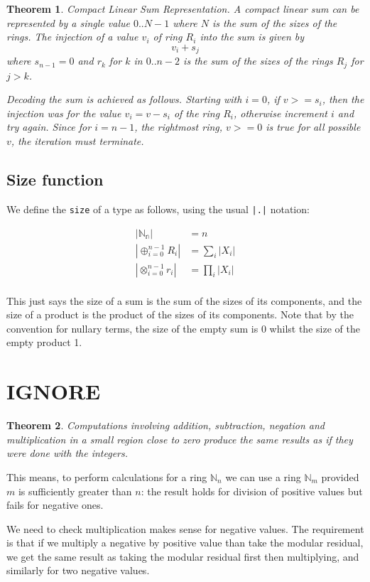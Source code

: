\documentclass{article}
\newtheorem{theorem}{Theorem}
\begin{document}
\begin{theorem} {\em Compact Linear Sum Representation}.
A compact linear sum can be represented by a single value
$0..{N-1}$ where $N$ is the sum of the sizes of the rings.
The injection of a value $v_i$ of ring $R_i$ into the sum is given by
$$v_i + s_j$$
where $s_{n-1}=0$ and $r_k$ for $k$ in $0..n-2$ is the sum of the sizes of the rings
$R_j$ for $j>k$.

Decoding the sum is achieved as follows. Starting with $i=0$, if $v >= s_i$,
then the injection was for the value $v_i = v - s_i$ of the ring $R_i$, otherwise
increment $i$ and try again. Since for $i=n-1$, the rightmost ring, $v>=0$ is
true for all possible $v$, the iteration must terminate.
\end{theorem}

\subsection{Size function}
We define the \verb$size$ of a type as follows, using the usual \verb$|.|$ notation:

\begin{align*}
|\mathbb{N_n}| &= n\\
|\oplus_{i=0}^{n-1} R_i| &= \sum_i|X_i|\\
|\otimes_{i=0}^{n-1} r_i| &= \prod_i|X_i|\\
\end{align*}

This just says the size of a sum is the sum of the sizes of its components,
and the size of a product is the product of the sizes of its components.
Note that by the convention for nullary terms, the size of the empty sum is 0  
whilst the size of the empty product 1.

\section{IGNORE}
\begin{theorem}
Computations involving addition, subtraction, negation and multiplication 
in a small region close to zero produce the same results
as if they were done with the integers.
\end{theorem}
This means, to perform calculations for a ring $\mathbb{N}_n$ we can use
a ring $\mathbb{N}_m$ provided $m$ is sufficiently greater than $n$:
the result holds for division of positive values but fails for negative ones.

We need to check multiplication makes sense for negative values. The requirement is
that if we multiply a negative by positive value than take the modular
residual, we get the same result as taking the modular residual first
then multiplying, and similarly for two negative values.
\end{document}
